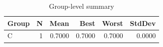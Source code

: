 \begin{table}[htbp]
\centering
\caption{Group-level summary}
\label{tab:group-summary}
\begin{tabular}{lrrrrr}
\toprule
\textbf{Group} & \textbf{N} & \textbf{Mean} & \textbf{Best} & \textbf{Worst} & \textbf{StdDev} \\
\midrule
C & 1 & 0.7000 & 0.7000 & 0.7000 & 0.0000 \\
\bottomrule
\end{tabular}
\end{table}